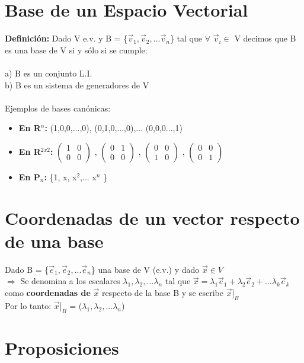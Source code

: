 \documentclass{article}
\begin{document}
\section{Base de un Espacio Vectorial}
{\bfseries Definición:} Dado V e.v. y B = \{$\vec{v}_{1}, \vec{v}_2,... \vec{v}_n $\} tal que $\forall$ $\vec{v}_{i} \in$ V decimos que B es una base de V si y sólo si se cumple:\\\\
a) B es un conjunto L.I.\\
b) B es un sistema de generadores de V \\\\
Ejemplos de bases canónicas: 
\begin{itemize}
\item {\bfseries En R$^{n}$:} (1,0,0,...,0), (0,1,0,...,0),... (0,0,0...,1) 
\item {\bfseries En R$^{2x2}$:} $\begin{pmatrix} 1&0\\ 0&0 \end{pmatrix}$ , $\begin{pmatrix} 0&1\\ 0&0 \end{pmatrix}$ , $\begin{pmatrix} 0&0\\ 1&0 \end{pmatrix}$ , $\begin{pmatrix} 0&0\\ 0&1 \end{pmatrix}$ 
\item {\bfseries En P$_{n}$:} \{1, x, x$^2$,... x$^n$ \} 
\end{itemize}
\section{Coordenadas de un vector respecto de una base}
Dado B = \{$\vec{e}_{1}, \vec{e}_2,... \vec{e}_n $\} una base de V (e.v.) y dado $\vec{x} \in V$\\ 
$\Rightarrow$ Se denomina a los escalares $\lambda_{1}, \lambda_{2},... \lambda_{n}$ tal que $\vec{x} = \lambda_{1}\vec{e}_{1} + \lambda_{2}\vec{e}_{2} +... \lambda_{k}\vec{e}_{k}$ como {\bfseries coordenadas de} $\vec{x} $ respecto de la base B y se escribe $\vec{x}]_B$ \\
Por lo tanto: $\vec{x}]_B$ = ($\lambda_{1}, \lambda_{2},... \lambda_{n}$)
\newpage
\section{Proposiciones}
\end{document}
